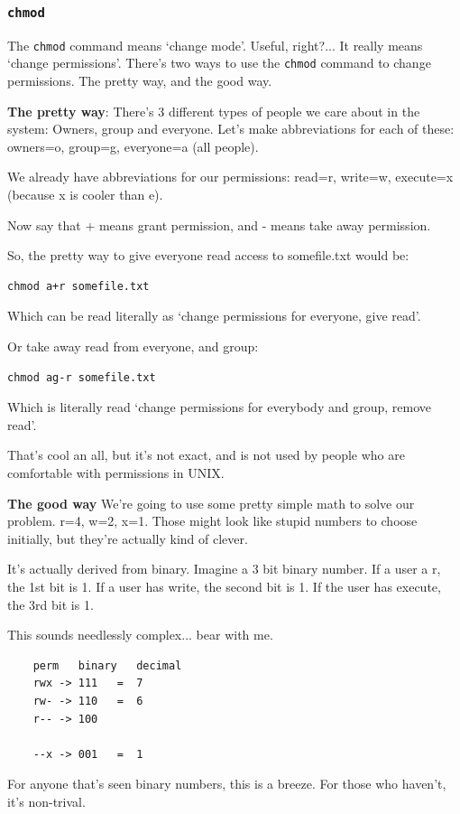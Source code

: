 \subsubsection{{\tt chmod}}
	The {\tt chmod} command means `change mode'. Useful, right?... It really means `change permissions'.
	There's two ways to use the {\tt chmod} command to change permissions. The pretty way, and the good way.
	
	\textbf{The pretty way}: There's 3 different types of people we care about in the system: Owners, group and everyone.
	Let's make abbreviations for each of these: owners=o, group=g, everyone=a (all people).
	
	We already have abbreviations for our permissions: read=r, write=w, execute=x (because x is cooler than e).
	
	Now say that + means grant permission, and - means take away permission.
	
	So, the pretty way to give everyone read access to somefile.txt would be:
	\begin{verbatim}chmod a+r somefile.txt \end{verbatim}
	Which can be read literally as `change permissions for everyone, give read'.
	
	Or take away read from everyone, and group:
	\begin{verbatim}chmod ag-r somefile.txt \end{verbatim}
	Which is literally read `change permissions for everybody and group, remove read'.
		
	That's cool an all, but it's not exact, and is not used by people who are comfortable with permissions in UNIX.
	
	\textbf{The good way}
	We're going to use some pretty simple math to solve our problem. r=4, w=2, x=1. Those might look like 
	stupid numbers to choose initially, but they're actually kind of clever.
	
	It's actually derived from binary. Imagine a 3 bit binary number. If a user a r, the 1st bit is 1.
	If a user has write, the second bit is 1. If the user has execute, the 3rd bit is 1.
	
	This sounds needlessly complex... bear with me.
	
\begin{verbatim}
	perm   binary   decimal
	rwx -> 111   =  7
	rw- -> 110   =  6
	r-- -> 100
	
	--x -> 001   =  1
\end{verbatim}
For anyone that's seen binary numbers, this is a breeze. For those who haven't, it's non-trival.

